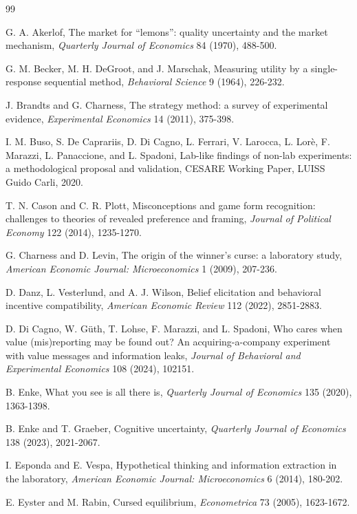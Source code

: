 \documentclass[11pt,a4paper]{article}
\begin{document}
\begin{thebibliography}{99}

 G. A. Akerlof, The market for ``lemons'': quality uncertainty and the market mechanism, \emph{Quarterly Journal of Economics} 84 (1970), 488-500.

 G. M. Becker, M. H. DeGroot, and J. Marschak, Measuring utility by a single-response sequential method, \emph{Behavioral Science} 9 (1964), 226-232.

 J. Brandts and G. Charness, The strategy method: a survey of experimental evidence, \emph{Experimental Economics} 14 (2011), 375-398.

 I. M. Buso, S. De Caprariis, D. Di Cagno, L. Ferrari, V. Larocca, L. Lor\`e, F. Marazzi, L. Panaccione, and L. Spadoni, Lab-like findings of non-lab experiments: a methodological proposal and validation, CESARE Working Paper, LUISS Guido Carli, 2020.

 T. N. Cason and C. R. Plott, Misconceptions and game form recognition: challenges to theories of revealed preference and framing, \emph{Journal of Political Economy} 122 (2014), 1235-1270.

 G. Charness and D. Levin, The origin of the winner's curse: a laboratory study, \emph{American Economic Journal: Microeconomics} 1 (2009), 207-236.

 D. Danz, L. Vesterlund, and A. J. Wilson, Belief elicitation and behavioral incentive compatibility, \emph{American Economic Review} 112 (2022), 2851-2883.

 D. Di Cagno, W. G\"uth, T. Lohse, F. Marazzi, and L. Spadoni, Who cares when value (mis)reporting may be found out? An acquiring-a-company experiment with value messages and information leaks, \emph{Journal of Behavioral and Experimental Economics} 108 (2024), 102151.

 B. Enke, What you see is all there is, \emph{Quarterly Journal of Economics} 135 (2020), 1363-1398.

 B. Enke and T. Graeber, Cognitive uncertainty, \emph{Quarterly Journal of Economics} 138 (2023), 2021-2067.

 I. Esponda and E. Vespa, Hypothetical thinking and information extraction in the laboratory, \emph{American Economic Journal: Microeconomics} 6 (2014), 180-202.

 E. Eyster and M. Rabin, Cursed equilibrium, \emph{Econometrica} 73 (2005), 1623-1672.


\end{thebibliography}
\end{document}
